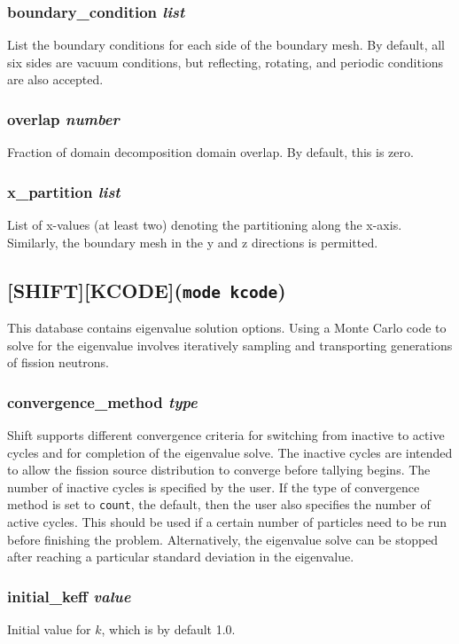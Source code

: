 \documentclass[10pt]{article}
\begin{document}
\subsubsection{boundary\_condition \textit{list}}
List the boundary conditions for each side of the boundary mesh. By default, all six sides are vacuum conditions, but reflecting, rotating, and periodic conditions are also accepted.

\subsubsection{overlap \textit{number}}
Fraction of domain decomposition domain overlap. By default, this is zero.

\subsubsection{x\_partition \textit{list}}
List of x-values (at least two) denoting the partitioning along the x-axis. Similarly, the boundary mesh in the y and z directions is permitted.

\subsection{[SHIFT][KCODE]\quad\quad\quad(\texttt{mode kcode})}
This database contains eigenvalue solution options. Using a Monte Carlo code to solve for the eigenvalue involves iteratively sampling and transporting generations of fission neutrons. 

\subsubsection{convergence\_method \textit{type}}
Shift supports different convergence criteria for switching from inactive to active cycles and for completion of the eigenvalue solve. The inactive cycles are intended to allow the fission source distribution to converge before tallying begins. The number of inactive cycles is specified by the user. If the type of convergence method is set to \texttt{count}, the default, then the user also specifies the number of active cycles. This should be used if a certain number of particles need to be run before finishing the problem. Alternatively, the eigenvalue solve can be stopped after reaching a particular standard deviation in the eigenvalue.

\subsubsection{initial\_keff \textit{value}}
Initial value for \(k\), which is by default 1.0.
\end{document}
